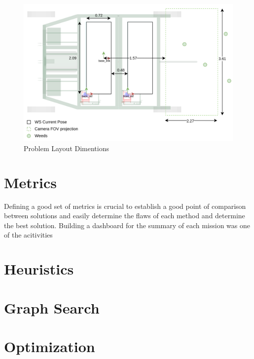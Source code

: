 \begin{figure}[bth]
    \centering
    \includegraphics[width=\linewidth]{gfx/ch02/problem_layout.png}
    \caption{Problem Layout Dimentions}
    \label{fig:problem-layout.png}
\end{figure}

\section{Metrics}
Defining a good set of metrics is crucial to establish a good point of comparison between solutions and easily determine the flaws of each method and determine the best solution. Building a dashboard for the summary of each mission was one of the acitivities 

\section{Heuristics}
\lipsum[1]

\section{Graph Search}
\lipsum[1]

\section{Optimization}
\lipsum[1]

